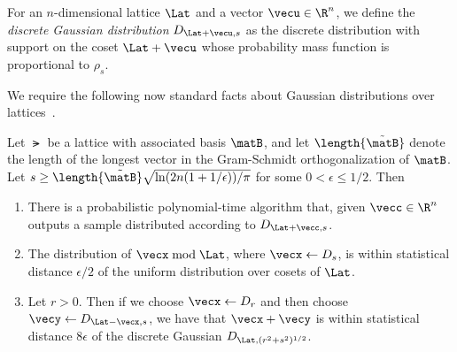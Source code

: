 For an $n$-dimensional lattice $\Lat$ and a vector $\vecu \in \R^{n}$,
we define the \emph{discrete Gaussian distribution} $D_{\Lat+\vecu,s}$
as the discrete distribution with support on the coset $\Lat+\vecu$
whose probability mass function is proportional to $\rho_{s}$. 

We require the following now standard facts about Gaussian distributions
over lattices~\cite{DBLP:journals/siamcomp/MicciancioR07,DBLP:conf/stoc/GentryPV08,DBLP:conf/stoc/BrakerskiLPRS13}.
\begin{lemma}\label{lem:latt-facts}
Let $\lat$ be a lattice with associated basis $\matB$, and let
$\length{\tilde{\matB}}$ denote the length of the longest vector in
the Gram-Schmidt orthogonalization of $\matB$. Let $s \geq
  \length{\tilde{\matB}}\sqrt{\ln(2n(1+1/\epsilon))/\pi}$ for some $0 <
  \epsilon \leq 1/2$. Then 
\begin{enumerate}
\item There is a probabilistic polynomial-time algorithm that, given
$\vecc \in \R^{n}$ outputs a sample distributed according to
  $D_{\Lat+\vecc,s}$.
\item The distribution of $\vecx \bmod{\Lat}$, where $\vecx \gets
  D_{s}$, is within statistical distance $\epsilon/2$ of the uniform
  distribution over cosets of $\Lat$. 
\item Let $r > 0$. Then if we choose $\vecx \gets D_{r}$ and then
  choose $\vecy \gets D_{\Lat-\vecx,s}$, we have that $\vecx+\vecy$ is
  within statistical distance $8\epsilon$ of the discrete Gaussian $D_{\Lat,(r^2+s^2)^{1/2}}$.
\end{enumerate}
\end{lemma}